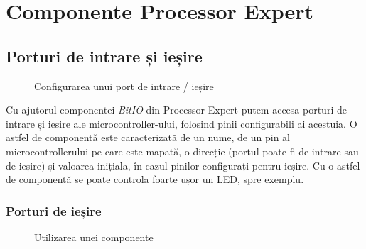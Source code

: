 \chapter{Componente Processor Expert}

\label{sec:ProcessorExpert}

\section{Porturi de intrare și ieșire}

\begin{figure}
    \vspace{-30pt}
    \vspace{-15pt}
    \caption{\label{fig:CodeWarrior-BitIO} Configurarea unui port de intrare / ieșire}
    \vspace{-10pt}
\end{figure}

Cu ajutorul componentei \textit{BitIO} din Processor Expert putem accesa porturi de intrare și iesire ale microcontroller-ului, folosind pinii configurabili ai acestuia. O astfel de componentă este caracterizată de un nume, de un pin al microcontrollerului pe care este mapată, o direcție (portul poate fi de intrare sau de ieșire) și valoarea inițiala, în cazul pinilor configurați pentru ieșire. Cu o astfel de componentă se poate controla foarte ușor un LED, spre exemplu.

\subsection{Porturi de ieșire}

\begin{figure}
    \vspace{-60pt}
    \vspace{-20pt}
    \caption{\label{fig:CodeWarrior-PExOutputIO} Utilizarea unei componente}
    \vspace{-10pt}
\end{figure}

